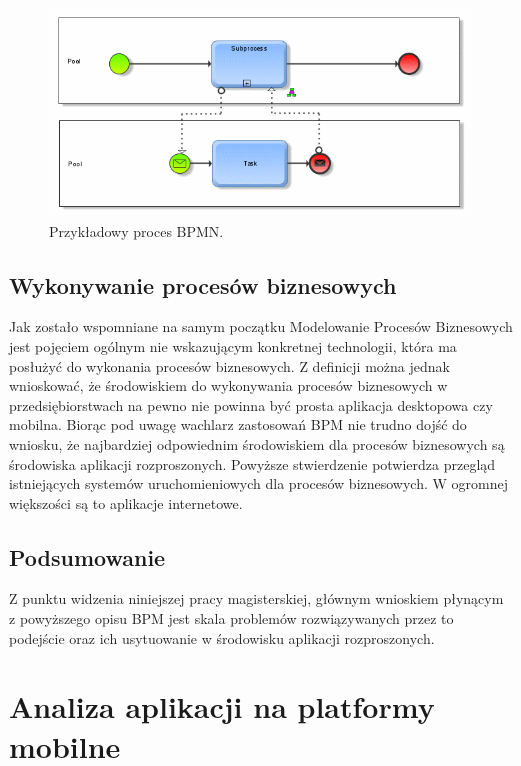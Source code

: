 \begin{figure}[h]
\centerline{\includegraphics[scale=0.8]{BPMN_example}}
\caption{Przykładowy proces BPMN.}
\label{fig:BPMN_example}
\end{figure}

\subsection{Wykonywanie procesów biznesowych}
\label{sec:wykonywanieBPM}

Jak zostało wspomniane na samym początku Modelowanie Procesów Biznesowych jest pojęciem ogólnym nie wskazującym konkretnej technologii, która ma posłużyć do wykonania procesów biznesowych. Z definicji można jednak wnioskować, że środowiskiem do wykonywania procesów biznesowych w przedsiębiorstwach na pewno nie powinna być prosta aplikacja desktopowa czy mobilna. Biorąc pod uwagę wachlarz zastosowań BPM nie trudno dojść do wniosku, że najbardziej odpowiednim środowiskiem dla procesów biznesowych są środowiska aplikacji rozproszonych. 
Powyższe stwierdzenie potwierdza przegląd istniejących systemów uruchomieniowych dla procesów biznesowych. W ogromnej większości są to aplikacje internetowe. 

\subsection{Podsumowanie}
\label{sec:podsumowanieBPM}

Z punktu widzenia niniejszej pracy magisterskiej, głównym wnioskiem płynącym z powyższego opisu BPM jest skala problemów rozwiązywanych przez to podejście oraz ich usytuowanie w środowisku aplikacji rozproszonych. 

\section{Analiza aplikacji na platformy mobilne}
\label{sec:analizaAplikacjiMobilnych}

